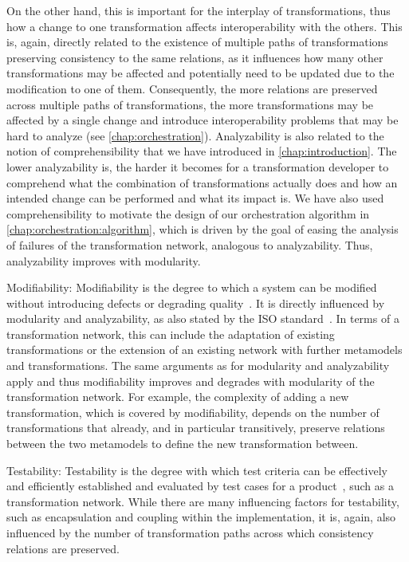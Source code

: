 \begin{properdescription}
    On the other hand, this is important for the interplay of transformations, thus how a change to one transformation affects interoperability with the others.
    This is, again, directly related to the existence of multiple paths of transformations preserving consistency to the same relations, as it influences how many other transformations may be affected and potentially need to be updated due to the modification to one of them.
    Consequently, the more relations are preserved across multiple paths of transformations, the more transformations may be affected by a single change and introduce interoperability problems that may be hard to analyze (see \autoref{chap:orchestration}).
    Analyzability is also related to the notion of comprehensibility that we have introduced in \autoref{chap:introduction}. The lower analyzability is, the harder it becomes for a transformation developer to comprehend what the combination of transformations actually does and how an intended change can be performed and what its impact is.
    We have also used comprehensibility to motivate the design of our orchestration algorithm in \autoref{chap:orchestration:algorithm}, which is driven by the goal of easing the analysis of failures of the transformation network, analogous to analyzability.
    Thus, analyzability improves with modularity.
    \item[Modifiability:]
    Modifiability is the degree to which a system can be modified without introducing defects or degrading quality~\cite[p.~15]{iso25010}.
    It is directly influenced by modularity and analyzability, as also stated by the ISO standard~\cite[p.~15]{iso25010}.
    In terms of a transformation network, this can include the adaptation of existing transformations or the extension of an existing network with further metamodels and transformations.
    The same arguments as for modularity and analyzability apply and thus modifiability improves and degrades with modularity of the transformation network.
    For example, the complexity of adding a new transformation, which is covered by modifiability, depends on the number of transformations that already, and in particular transitively, preserve relations between the two metamodels to define the new transformation between.
    \item[Testability:]
    Testability is the degree with which test criteria can be effectively and efficiently established and evaluated by test cases for a product~\cite[p.~15]{iso25010}, such as a transformation network.
    While there are many influencing factors for testability, such as encapsulation and coupling within the implementation, it is, again, also influenced by the number of transformation paths across which consistency relations are preserved.

\end{properdescription}
